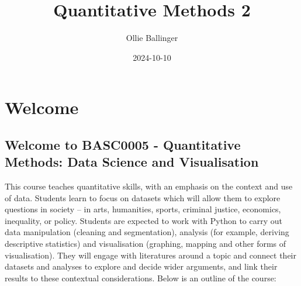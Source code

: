 \documentclass[
  letterpaper,
  DIV=11,
  numbers=noendperiod]{scrreprt}
\title{Quantitative Methods 2}
\author{Ollie Ballinger}
\date{2024-10-10}
\renewcommand*\contentsname{Table of contents}
\newcommand\contentsname{Table of contents}
\begin{document}
\maketitle
\ifdefined\Shaded\renewenvironment{Shaded}{\begin{tcolorbox}[interior hidden, boxrule=0pt, sharp corners, frame hidden, borderline west={3pt}{0pt}{shadecolor}, enhanced, breakable]}{\end{tcolorbox}}\fi

\renewcommand*\contentsname{Table of contents}
{
\hypersetup{linkcolor=}
\setcounter{tocdepth}{2}
\tableofcontents
}

\hypertarget{welcome}{%
\chapter*{Welcome}\label{welcome}}


\hypertarget{welcome-to-basc0005---quantitative-methods-data-science-and-visualisation}{%
\section*{Welcome to BASC0005 - Quantitative Methods: Data Science and
Visualisation}\label{welcome-to-basc0005---quantitative-methods-data-science-and-visualisation}}


This course teaches quantitative skills, with an emphasis on the context
and use of data. Students learn to focus on datasets which will allow
them to explore questions in society -- in arts, humanities, sports,
criminal justice, economics, inequality, or policy. Students are
expected to work with Python to carry out data manipulation (cleaning
and segmentation), analysis (for example, deriving descriptive
statistics) and visualisation (graphing, mapping and other forms of
visualisation). They will engage with literatures around a topic and
connect their datasets and analyses to explore and decide wider
arguments, and link their results to these contextual considerations.
Below is an outline of the course:
\end{document}
